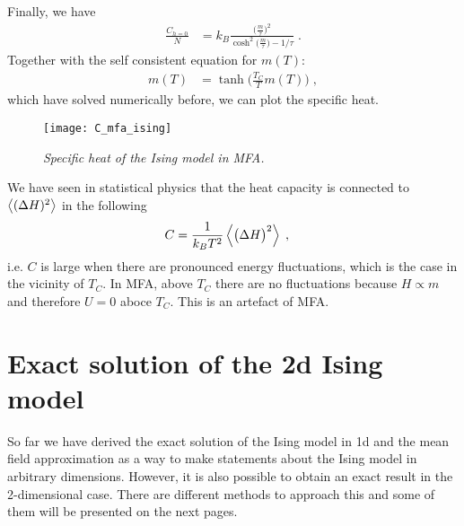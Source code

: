 %
Finally, we have 
%
\begin{align}\label{eq:}
\frac{C_{h=0}}{N} &=k_{B 	}
\frac{\big(\frac{m}{\tau}\big)^{2}}{ \cosh^{2}\big( \frac{m}{\tau} \big) - 1/\tau }\;.
\end{align}
%
%
Together with the self consistent equation for $m(T)$:
%
\begin{align*}
m(T) &= \tanh\bigg(\frac{T_{C}}{T} m(T)\bigg)\;,
\end{align*}
%
which have solved numerically before, we can plot the specific heat.
\begin{figure}[t]
\begin{center}
\texttt{[image: C\_mfa\_ising]}
\caption{{\it Specific heat of the Ising model in MFA.}}
\end{center}
\end{figure}

We have seen in  statistical physics that the heat capacity is connected to $\left\langle(\Delta H)^2\right\rangle$ in the following 
%
\begin{align*}
C&= \frac{1}{k_{B} T^{2}} \left\langle\big( \Delta H \big)^{2}\right\rangle\;,
\end{align*}
%
i.e. $C$ is large when there are pronounced energy fluctuations,
which is the case in the vicinity of $T_{C}$.
In  MFA, above $T_{C}$ there are no fluctuations because
$H \propto m$ and therefore $U=0$ aboce $T_{C}$.
This is an artefact of MFA.

\section{Exact solution of the 2d Ising model}

So far we have derived the exact solution of the Ising model in 1d and the mean field approximation as a way to make statements about the Ising model in arbitrary dimensions. However, it is also possible to obtain an exact result in the 2-dimensional case. There are different methods to approach this and some of them will be presented on the next pages.

